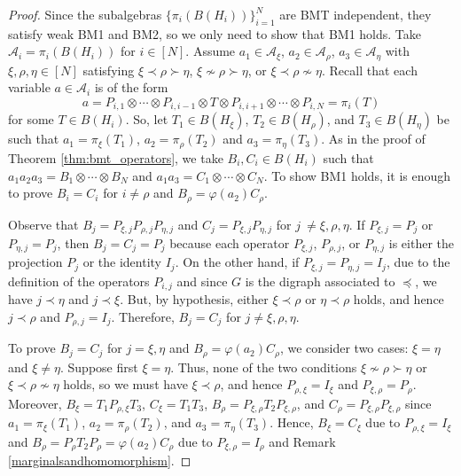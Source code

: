 \documentclass[a4paper,12pt]{extarticle}
\theoremstyle{definition}
\theoremstyle{remark}
\def\AA{\mathcal{A}}
\begin{document}
\begin{proof}
	Since the subalgebras $\{\pi_i(B(H_i))\}_{i=1}^N$ are BMT independent, they satisfy weak BM1 and BM2, so we only need to show that BM1 holds. 
	Take $\AA_i=\pi_{i}(B(H_{i}))$ for $i\in [N]$. 
	Assume $a_1\in \AA_\xi$, $a_2\in \AA_\rho$, $a_3\in \AA_\eta$ with $\xi, \rho, \eta \in [N]$ satisfying $\xi\prec \rho \succ \eta$, $\xi \nsim \rho \succ \eta$, or $\xi\prec \rho \nsim \eta$. 
	Recall that each variable $a \in \AA_{i}$ is of the form 
	\[ a = P_{i,1}\otimes \cdots \otimes P_{i, i-1}\otimes T \otimes P_{i,i+1}\otimes \cdots \otimes P_{i,N}=\pi_{i}(T) \]
	for some $T \in B(H_{i})$. 
	So,  let $T_1\in B(H_\xi)$, $T_2\in B(H_\rho)$, and $T_3\in B(H_\eta)$ be such that $a_1=\pi_\xi(T_1)$, $a_2=\pi_\rho(T_2)$ and $a_3=\pi_\eta(T_3)$.
	As in the proof of Theorem \ref{thm:bmt_operators}, we take $B_i,C_i\in B(H_i)$ such that $a_1 a_2 a_3 =B_1\otimes \cdots \otimes B_N$ and $a_1 a_3 =C_1\otimes \cdots \otimes C_N$. 
	To show BM1 holds, it is enough to prove $B_i=C_i$ for $i\neq \rho$ and $B_\rho=\varphi(a_2)C_\rho$. 
	
	
	
	Observe that $B_j=P_{\xi,j}P_{\rho,j}P_{\eta,j}$ and $C_j=P_{\xi,j}P_{\eta,j}$ for $j\ \neq \xi,\rho,\eta$. 
	If $P_{\xi,j}=P_j$ or $P_{\eta,j}=P_j$, then $B_j = C_j = P_j$  because each operator $P_{\xi,j}$, $P_{\rho,j}$, or $P_{\eta,j}$ is either the projection $P_j$ or the identity $I_j$. 
	On the other hand, if $P_{\xi,j}=P_{\eta,j}=I_j$, due to the definition of the operators $P_{i,j}$ and since $G$ is the digraph associated to $\preceq$, we  have $j\prec \eta$ and $j\prec \xi$. 
	But, by hypothesis, either $\xi \prec \rho$ or $\eta \prec \rho$ holds, and hence $j\prec \rho$ and $P_{\rho,j}=I_j$. 
	Therefore, $B_j=C_j$ for $j \neq \xi, \rho, \eta$. 
	
	
	To prove $B_j=C_j$ for $j = \xi, \eta$ and $B_\rho=\varphi(a_2)C_\rho$, we consider two cases:  $\xi=\eta$ and $\xi\neq \eta$. 
	Suppose first  $\xi=\eta$. 
	Thus, none of the two conditions $\xi \nsim \rho \succ \eta$ or $\xi\prec \rho \nsim \eta$ holds, so we must have $\xi\prec \rho$, and hence $P_{\rho,\xi}=I_\xi$ and $P_{\xi,\rho}=P_\rho$. 
	Moreover,  $B_\xi=T_1 P_{\rho,\xi}T_3$, $C_\xi=T_1 T_3$, $B_\rho=P_{\xi,\rho}T_2 P_{\xi,\rho}$,  and $C_\rho=P_{\xi,\rho}P_{\xi,\rho}$ since  $a_1=\pi_\xi(T_1)$, $a_2=\pi_\rho(T_2)$, and $a_3=\pi_\eta(T_3)$. 
	Hence, $B_\xi = C_\xi$ due to $P_{\rho,\xi} = I_\xi$ and $B_\rho= P_\rho T_2 P_\rho = \varphi(a_2)C_\rho$ due to $P_{\xi,\rho} = I_\rho$ and Remark  \ref{marginalsandhomomorphism}.  
	

\end{proof}
\end{document}
